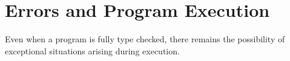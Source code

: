 \chapter{Errors and Program Execution}
\label{errors}

Even when a program is fully type checked, there remains the possibility of exceptional situations arising during execution.